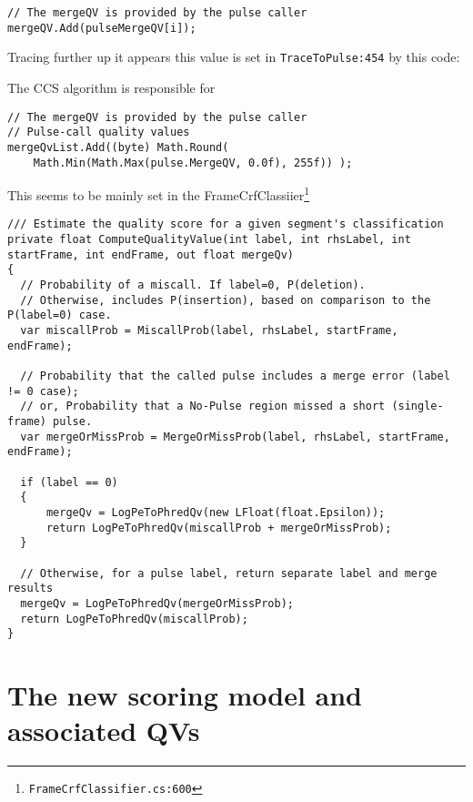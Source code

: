\documentclass[fleqn,10pt]{SelfArx} %
\begin{document}
\lstset{style=sharpc}
\begin{lstlisting}[frame=single]
// The mergeQV is provided by the pulse caller
mergeQV.Add(pulseMergeQV[i]);
\end{lstlisting}

Tracing further up it appears this value is set in \texttt{TraceToPulse:454} by this code:

The CCS algorithm is responsible for 




\lstset{style=sharpc}
\begin{lstlisting}[frame=single]
// The mergeQV is provided by the pulse caller
// Pulse-call quality values
mergeQvList.Add((byte) Math.Round(
	Math.Min(Math.Max(pulse.MergeQV, 0.0f), 255f)) );

\end{lstlisting}

This seems to be mainly set in the FrameCrfClassiier\footnote{\texttt{FrameCrfClassifier.cs:600}}

\lstset{style=sharpc}
\begin{lstlisting}[frame=single, float=*]
/// Estimate the quality score for a given segment's classification
private float ComputeQualityValue(int label, int rhsLabel, int startFrame, int endFrame, out float mergeQv)
{
  // Probability of a miscall. If label=0, P(deletion).  
  // Otherwise, includes P(insertion), based on comparison to the P(label=0) case.
  var miscallProb = MiscallProb(label, rhsLabel, startFrame, endFrame);  

  // Probability that the called pulse includes a merge error (label != 0 case);
  // or, Probability that a No-Pulse region missed a short (single-frame) pulse.
  var mergeOrMissProb = MergeOrMissProb(label, rhsLabel, startFrame, endFrame);  

  if (label == 0)
  {
      mergeQv = LogPeToPhredQv(new LFloat(float.Epsilon)); 
      return LogPeToPhredQv(miscallProb + mergeOrMissProb);
  }  

  // Otherwise, for a pulse label, return separate label and merge results
  mergeQv = LogPeToPhredQv(mergeOrMissProb);
  return LogPeToPhredQv(miscallProb);
}       
\end{lstlisting}


\section*{The new scoring model and associated QVs}
\end{document}
